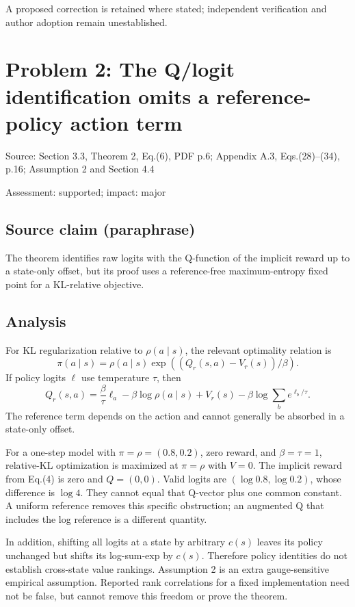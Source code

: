 \documentclass[11pt]{article}
\begin{document}
A proposed correction is retained where stated; independent verification and author adoption remain unestablished.

\section*{Problem 2: The Q/logit identification omits a reference-policy action term}

Source: Section 3.3, Theorem 2, Eq.(6), PDF p.6; Appendix A.3, Eqs.(28)–(34), p.16; Assumption 2 and Section 4.4

Assessment: supported; impact: major

\subsection*{Source claim (paraphrase)}

The theorem identifies raw logits with the Q-function of the implicit reward up to a state-only offset, but its proof uses a reference-free maximum-entropy fixed point for a KL-relative objective.

\subsection*{Analysis}

For KL regularization relative to \(\rho(a\mid s)\), the relevant optimality relation is \[\pi(a\mid s)=\rho(a\mid s)\exp((Q_r(s,a)-V_r(s))/\beta).\] If policy logits \(\ell\) use temperature \(\tau\), then \[Q_r(s,a)=\frac{\beta}{\tau}\ell_a-\beta\log\rho(a\mid s)+V_r(s)-\beta\log\sum_b e^{\ell_b/\tau}.\] The reference term depends on the action and cannot generally be absorbed in a state-only offset.

For a one-step model with \(\pi=\rho=(0.8,0.2)\), zero reward, and \(\beta=\tau=1\), relative-KL optimization is maximized at \(\pi=\rho\) with \(V=0\). The implicit reward from Eq.(4) is zero and \(Q=(0,0)\). Valid logits are \((\log0.8,\log0.2)\), whose difference is \(\log4\). They cannot equal that Q-vector plus one common constant. A uniform reference removes this specific obstruction; an augmented Q that includes the log reference is a different quantity.

In addition, shifting all logits at a state by arbitrary \(c(s)\) leaves its policy unchanged but shifts its log-sum-exp by \(c(s)\). Therefore policy identities do not establish cross-state value rankings. Assumption 2 is an extra gauge-sensitive empirical assumption. Reported rank correlations for a fixed implementation need not be false, but cannot remove this freedom or prove the theorem.
\end{document}
